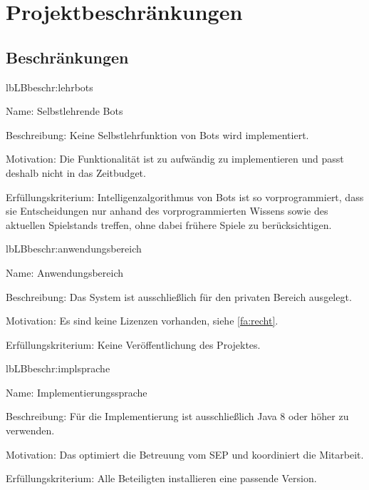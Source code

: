 \chapter{Projektbeschränkungen}

\section{Beschränkungen}

\setcounter{lb}{10}

\begin{description}[leftmargin=5em, style=sameline]
	
	\begin{lhp}{lb}{LB}{beschr:lehrbots}
		\item [Name:] Selbstlehrende Bots
		\item [Beschreibung:] Keine Selbstlehrfunktion von Bots wird implementiert.
		\item [Motivation:] Die Funktionalität ist zu aufwändig zu implementieren und passt deshalb nicht in das Zeitbudget.
		\item [Erfüllungskriterium:] Intelligenzalgorithmus von Bots ist so vorprogrammiert, dass sie Entscheidungen nur anhand des vorprogrammierten Wissens sowie des aktuellen Spielstands treffen, ohne dabei frühere Spiele zu berücksichtigen.
	\end{lhp}
	
	\begin{lhp}{lb}{LB}{beschr:anwendungsbereich}
		\item [Name:] Anwendungsbereich
		\item [Beschreibung:] Das System ist ausschließlich für den privaten Bereich ausgelegt.
		\item [Motivation:] Es sind keine Lizenzen vorhanden, siehe \ref{fa:recht}. 
		\item [Erfüllungskriterium:] Keine Veröffentlichung des Projektes.
	\end{lhp}
	
		
	\begin{lhp}{lb}{LB}{beschr:implsprache}
		\item [Name:] Implementierungssprache
		\item [Beschreibung:] Für die Implementierung ist ausschließlich Java 8 oder höher zu verwenden.
		\item [Motivation:] Das optimiert die Betreuung vom SEP und koordiniert die Mitarbeit.
		\item [Erfüllungskriterium:] Alle Beteiligten installieren eine passende Version.
	\end{lhp}
	

\end{description}
